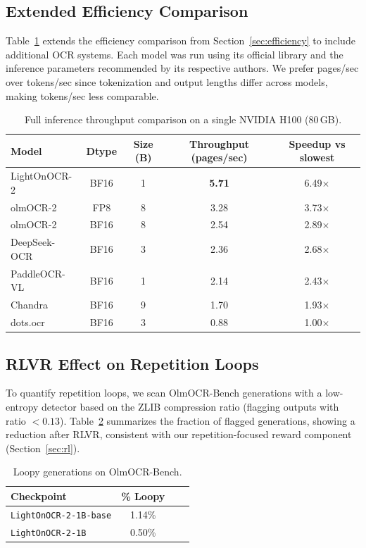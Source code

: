 \documentclass{article}
\begin{document}
\subsection{Extended Efficiency Comparison}
\label{app:efficiency_full}
Table~\ref{tab:efficiency_full} extends the efficiency comparison from Section~\ref{sec:efficiency} to include additional OCR systems. Each model was run using its official library and the inference parameters recommended by its respective authors. We prefer pages/sec over tokens/sec since tokenization and output lengths differ across models, making tokens/sec less comparable.

\begin{table}[htbp!]
\centering
\small
\setlength{\tabcolsep}{6pt}
\begin{tabular}{lcccc}
\toprule
\textbf{Model} & \textbf{Dtype} & \textbf{Size (B)} & \textbf{Throughput (pages/sec)} & \textbf{Speedup vs slowest} \\
\midrule
LightOnOCR-2 & BF16 & 1 & \textbf{5.71} & 6.49$\times$ \\
olmOCR-2 & FP8 & 8 & 3.28 & 3.73$\times$ \\
olmOCR-2 & BF16 & 8 & 2.54 & 2.89$\times$ \\
DeepSeek-OCR & BF16 & 3 & 2.36 & 2.68$\times$ \\
PaddleOCR-VL & BF16 & 1 & 2.14 & 2.43$\times$ \\
Chandra & BF16 & 9 & 1.70 & 1.93$\times$ \\
dots.ocr & BF16 & 3 & 0.88 & 1.00$\times$ \\
\bottomrule
\end{tabular}
\caption{Full inference throughput comparison on a single NVIDIA H100 (80\,GB).}
\label{tab:efficiency_full}
\end{table}

\subsection{RLVR Effect on Repetition Loops}
\label{app:repetitions}
To quantify repetition loops, we scan OlmOCR-Bench generations with a low-entropy detector based on the ZLIB compression ratio (flagging outputs with ratio $<0.13$). Table~\ref{tab:repetition_loops} summarizes the fraction of flagged generations, showing a reduction after RLVR, consistent with our repetition-focused reward component (Section~\ref{sec:rl}).

\begin{table}[h]
\centering
\small
\setlength{\tabcolsep}{8pt}
\begin{tabular}{lccc}
\toprule
\textbf{Checkpoint} & \textbf{\% Loopy} \\
\midrule
\texttt{LightOnOCR-2-1B-base} & 1.14\% \\
\texttt{LightOnOCR-2-1B} & 0.50\% \\
\bottomrule
\end{tabular}
\caption{Loopy generations on OlmOCR-Bench.}
\label{tab:repetition_loops}
\end{table}
\end{document}
